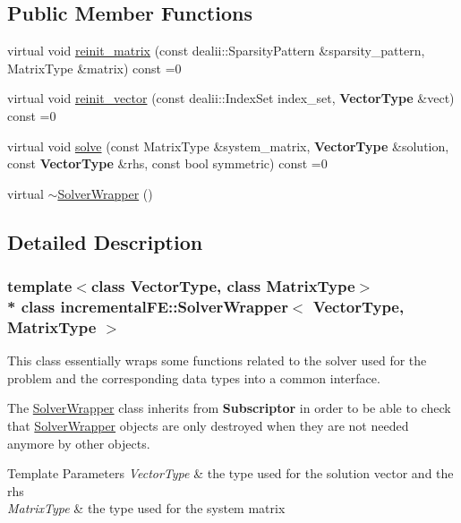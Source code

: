 \subsection*{Public Member Functions}
\begin{DoxyCompactItemize}
\item 
virtual void \hyperlink{classincremental_f_e_1_1_solver_wrapper_adfb16a432d9fec822d299384c0a9a74e}{reinit\+\_\+matrix} (const dealii\+::\+Sparsity\+Pattern \&sparsity\+\_\+pattern, Matrix\+Type \&matrix) const =0
\item 
virtual void \hyperlink{classincremental_f_e_1_1_solver_wrapper_a32ceb887df0c07520f93294b3df01c87}{reinit\+\_\+vector} (const dealii\+::\+Index\+Set index\+\_\+set, {\bf Vector\+Type} \&vect) const =0
\item 
virtual void \hyperlink{classincremental_f_e_1_1_solver_wrapper_a1483c02adec285bf663ddf6ec3742403}{solve} (const Matrix\+Type \&system\+\_\+matrix, {\bf Vector\+Type} \&solution, const {\bf Vector\+Type} \&rhs, const bool symmetric) const =0
\item 
virtual \hyperlink{classincremental_f_e_1_1_solver_wrapper_a1c3f8c35d9832e3eb76021253c3fdde2}{$\sim$\+Solver\+Wrapper} ()
\end{DoxyCompactItemize}


\subsection{Detailed Description}
\subsubsection*{template$<$class Vector\+Type, class Matrix\+Type$>$\\*
class incremental\+F\+E\+::\+Solver\+Wrapper$<$ Vector\+Type, Matrix\+Type $>$}

This class essentially wraps some functions related to the solver used for the problem and the corresponding data types into a common interface.

The \hyperlink{classincremental_f_e_1_1_solver_wrapper}{Solver\+Wrapper} class inherits from {\bf Subscriptor} in order to be able to check that \hyperlink{classincremental_f_e_1_1_solver_wrapper}{Solver\+Wrapper} objects are only destroyed when they are not needed anymore by other objects.


\begin{DoxyTemplParams}{Template Parameters}
{\em Vector\+Type} & the type used for the solution vector and the rhs\\
\hline
{\em Matrix\+Type} & the type used for the system matrix \\
\hline
\end{DoxyTemplParams}


